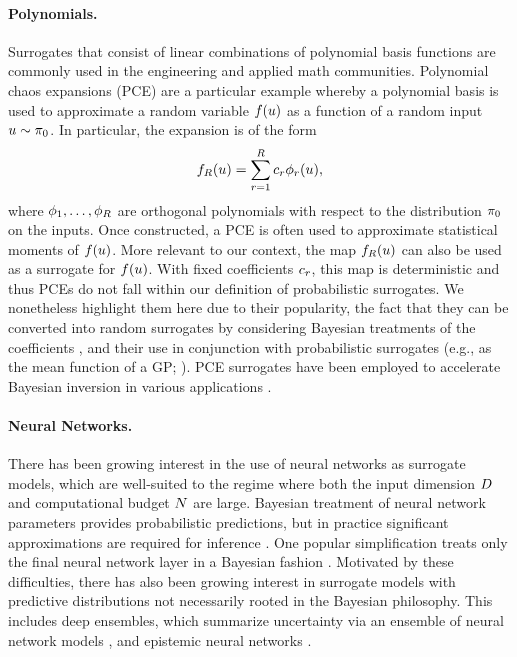 \documentclass[12pt]{article}
\begin{document}
\paragraph{Polynomials.}
Surrogates that consist of linear combinations of polynomial basis functions are 
commonly used in the engineering and applied math communities. Polynomial 
chaos expansions (PCE) are a particular example whereby a polynomial 
basis is used to approximate a random variable $\func(\Par)$ as a function of
a random input $\Par \sim \priorDens$. In particular, the expansion is of the form
\begin{equation}
\funcEm[\dimBasis](\Par) = \sum_{\idxBasis=1}^{\dimBasis} c_{\idxBasis} \basisVec_{\idxBasis}(\Par),
\end{equation}
where $\basisVec_{1}, \dots, \basisVec_{\dimBasis}$ are orthogonal polynomials with respect 
to the distribution $\priorDens$ on the inputs. Once constructed, a PCE is often used to 
approximate statistical moments of $\func(\Par)$. More relevant to our context,
the map $\funcEm[\dimBasis](\Par)$ can also be used as a surrogate for $\func(\Par)$.
With fixed coefficients $c_{\idxBasis}$, this map is deterministic and thus PCEs do not fall
within our definition of probabilistic surrogates. We nonetheless highlight them here
due to their popularity, the fact that they can be converted into random surrogates by 
considering Bayesian treatments of the coefficients 
\citep{BayesianPCE1,BayesianPCE2,BurknerSurrogate},
and their use in conjunction with probabilistic surrogates (e.g., as the mean function
of a GP; \citet{PCEGPWind,PCEGP2,SinsbeckNowak}). PCE surrogates have been
employed to accelerate Bayesian inversion in various applications 
\citep{dimRedPolyChaos,BurknerSurrogate,PCEBIP}.

\paragraph{Neural Networks.}
There has been growing interest in the use of neural networks as surrogate models, 
which are well-suited to the regime where both the input dimension $\dimPar$ 
and computational budget $\Ndesign$ are large. Bayesian treatment of neural 
network parameters provides probabilistic predictions, but in practice significant 
approximations are required for inference \citep{BayesOptNN}. One popular simplification
treats only the final neural network layer in a Bayesian fashion 
\citep{BayesLastLayer,BayesOptBayesLastLayer}. Motivated by these difficulties,
there has also been growing interest in surrogate models with predictive distributions 
not necessarily rooted in the Bayesian philosophy. This includes deep ensembles, 
which summarize uncertainty via an ensemble of neural network 
models \citep{deepEnsembles,Lueckmann2018LikelihoodfreeIW},
and epistemic neural networks \citep{epistemicNN,BayesOptEpistemicNN}. 
\end{document}
